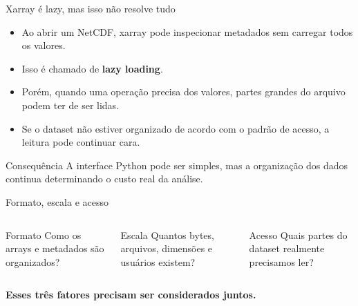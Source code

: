 \documentclass[aspectratio=169]{beamer}
\begin{document}
\begin{frame}{Xarray é lazy, mas isso não resolve tudo}
\begin{itemize}
  \item Ao abrir um NetCDF, xarray pode inspecionar metadados sem carregar todos os valores.
  \item Isso é chamado de \textbf{lazy loading}.
  \item Porém, quando uma operação precisa dos valores, partes grandes do arquivo podem ter de ser lidas.
  \item Se o dataset não estiver organizado de acordo com o padrão de acesso, a leitura pode continuar cara.
\end{itemize}

\vspace{0.4cm}

\begin{block}{Consequência}
A interface Python pode ser simples, mas a organização dos dados continua determinando o custo real da análise.
\end{block}
\end{frame}

\begin{frame}{Formato, escala e acesso}
\begin{columns}
\begin{block}{Formato}
Como os arrays e metadados são organizados?
\end{block}

\begin{block}{Escala}
Quantos bytes, arquivos, dimensões e usuários existem?
\end{block}

\begin{block}{Acesso}
Quais partes do dataset realmente precisamos ler?
\end{block}
\end{columns}

\vspace{0.7cm}

\Large
\centering
\textbf{Esses três fatores precisam ser considerados juntos.}
\end{frame}
\end{document}

